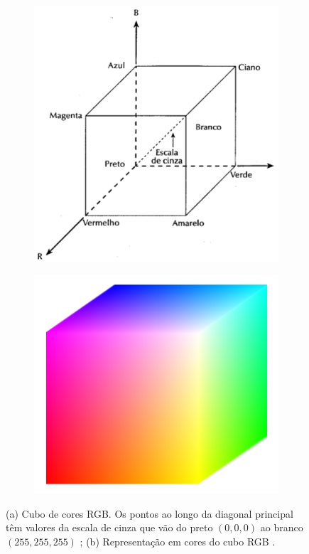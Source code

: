 \begin{figure}[ht]
  \begin{center}
    \begin{subfigure}[b]{.49\textwidth}
      \begin{center}
        \includegraphics[width=.85\linewidth]{imgs/cubo_rgb.png}
      \end{center}
      \caption{}
      \label{fig:cubo_rgb}
    \end{subfigure}
    \begin{subfigure}[b]{.49\textwidth}
      \begin{center}
        \includegraphics[width=.9\linewidth]{imgs/colorcube.png}
      \end{center}
      \caption{}
      \label{fig:colorcube}
    \end{subfigure}
  \end{center}
  \caption{(a) Cubo de cores RGB. Os pontos ao longo da diagonal principal têm valores da escala de cinza que vão do preto $(0,0,0)$ ao branco $(255,255,255)$ \citep{woods:2000:book}; (b) Representação em cores do cubo RGB \citep{theo:2003:online}.}
  \label{fig:cubos}
\end{figure}

